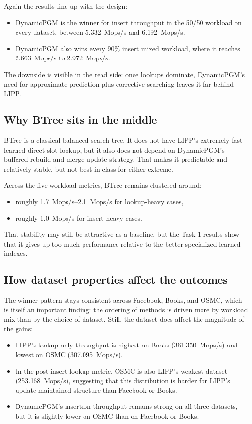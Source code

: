 \documentclass[11pt]{article}
\begin{document}
Again the results line up with the design:
\begin{itemize}[leftmargin=1.5em]
    \item DynamicPGM is the winner for insert throughput in the 50/50 workload on every
    dataset, between \SI{5.332}{Mops/s} and \SI{6.192}{Mops/s}.
    \item DynamicPGM also wins every 90\% insert mixed workload, where it reaches
    \SI{2.663}{Mops/s} to \SI{2.972}{Mops/s}.
\end{itemize}

The downside is visible in the read side: once lookups dominate, DynamicPGM's need for
approximate prediction plus corrective searching leaves it far behind LIPP.

\subsection{Why BTree sits in the middle}
BTree is a classical balanced search tree. It does not have LIPP's extremely fast
learned direct-slot lookup, but it also does not depend on DynamicPGM's buffered
rebuild-and-merge update strategy. That makes it predictable and relatively stable, but
not best-in-class for either extreme.

Across the five workload metrics, BTree remains clustered around:
\begin{itemize}[leftmargin=1.5em]
    \item roughly \SI{1.7}{Mops/s}--\SI{2.1}{Mops/s} for lookup-heavy cases,
    \item roughly \SI{1.0}{Mops/s} for insert-heavy cases.
\end{itemize}

That stability may still be attractive as a baseline, but the Task 1 results show that
it gives up too much performance relative to the better-specialized learned indexes.

\subsection{How dataset properties affect the outcomes}
The winner pattern stays consistent across Facebook, Books, and OSMC, which is itself an
important finding: the ordering of methods is driven more by workload mix than by the
choice of dataset. Still, the dataset does affect the magnitude of the gains:
\begin{itemize}[leftmargin=1.5em]
    \item LIPP's lookup-only throughput is highest on Books
    (\SI{361.350}{Mops/s}) and lowest on OSMC (\SI{307.095}{Mops/s}).
    \item In the post-insert lookup metric, OSMC is also LIPP's weakest dataset
    (\SI{253.168}{Mops/s}), suggesting that this distribution is harder for LIPP's
    update-maintained structure than Facebook or Books.
    \item DynamicPGM's insertion throughput remains strong on all three datasets, but it
    is slightly lower on OSMC than on Facebook or Books.
\end{itemize}
\end{document}
